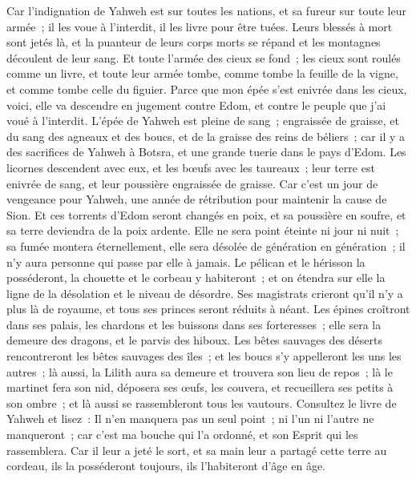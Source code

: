 \begin{multicols}{2}
Car l'indignation de Yahweh est sur toutes les nations, et sa fureur sur toute leur armée~; il les voue à l'interdit, il les livre pour être tuées.
Leurs blessés à mort sont jetés là, et la puanteur de leurs corps morts se répand et les montagnes découlent de leur sang.
Et toute l'armée des cieux se fond~; les cieux sont roulés comme un livre, et toute leur armée tombe, comme tombe la feuille de la vigne, et comme tombe celle du figuier.
Parce que mon épée s'est enivrée dans les cieux, voici, elle va descendre en jugement contre Edom, et contre le peuple que j'ai voué à l'interdit.
L'épée de Yahweh est pleine de sang~; engraissée de graisse, et du sang des agneaux et des boucs, et de la graisse des reins de béliers~; car il y a des sacrifices de Yahweh à Botsra, et une grande tuerie dans le pays d'Edom.
Les licornes descendent avec eux, et les bœufs avec les taureaux~; leur terre est enivrée de sang, et leur poussière engraissée de graisse.
Car c'est un jour de vengeance pour Yahweh, une année de rétribution pour maintenir la cause de Sion.
Et ces torrents d'Edom seront changés en poix, et sa poussière en soufre, et sa terre deviendra de la poix ardente.
Elle ne sera point éteinte ni jour ni nuit~; sa fumée montera éternellement, elle sera désolée de génération en génération~; il n'y aura personne qui passe par elle à jamais.
Le pélican et le hérisson la posséderont, la chouette et le corbeau y habiteront~; et on étendra sur elle la ligne de la désolation et le niveau de désordre.
Ses magistrats crieront qu'il n'y a plus là de royaume, et tous ses princes seront réduits à néant.
Les épines croîtront dans ses palais, les chardons et les buissons dans ses forteresses~; elle sera la demeure des dragons, et le parvis des hiboux.
Les bêtes sauvages des déserts rencontreront les bêtes sauvages des îles~; et les boucs s'y appelleront les uns les autres~; là aussi, la Lilith aura sa demeure et trouvera son lieu de repos~;
là le martinet fera son nid, déposera ses œufs, les couvera, et recueillera ses petits à son ombre~; et là aussi se rassembleront tous les vautours.
Consultez le livre de Yahweh et lisez~: Il n'en manquera pas un seul point~; ni l'un ni l'autre ne manqueront~; car c'est ma bouche qui l'a ordonné, et son Esprit qui les rassemblera.
Car il leur a jeté le sort, et sa main leur a partagé cette terre au cordeau, ils la posséderont toujours, ils l'habiteront d'âge en âge.

\end{multicols}
